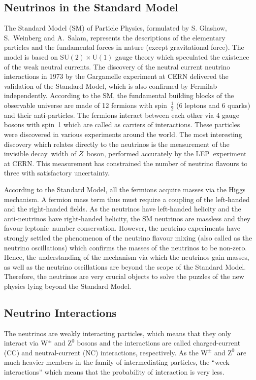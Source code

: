 \subsection{Neutrinos in the Standard Model}
The Standard Model (SM) of Particle Physics, formulated by
S. Glashow, S.~Weinberg and A.~Salam, represents the descriptions of
the elementary particles and the fundamental forces in nature
(except gravitational force)\cite{glashow1959, weinberg1967,abdus1968}.
The model is based on
$\text{SU}\left(2\right)\times\text{U}\left(1\right)$ gauge theory
which speculated the existence of the weak neutral
currents\cite{glashow1961}.
The discovery of the neutral current neutrino interactions in 1973
by the Gargamelle experiment at CERN delivered the validation of the
Standard Model\cite{hasert1973,hasert1973_1,hasert1974}, which is
also confirmed by Fermilab independently\cite{benvenuti1974}.
According to the SM, the fundamental building blocks of the observable
universe are made of 12 fermions with spin~$\frac{1}{2}$ (6 leptons and
6 quarks) and their anti-particles. The fermions interact between
each other via 4 gauge bosons with spin~1 which are called as
carriers of interactions. These particles were discovered in various
experiments around the world. The most interesting discovery which
relates directly to the neutrinos is the measurement of the invisible
decay~width of $Z$~boson, performed accurately by the LEP~experiment
at CERN\cite{numberneut}. This measurement has constrained the number
of neutrino flavours to three with satisfactory uncertainty.

According to the Standard Model, all the fermions acquire masses via
the Higgs mechanism. A fermion mass term thus must require a coupling
of the left-handed and the right-handed fields. As the neutrinos have
left-handed helicity and the anti-neutrinos have right-handed
helicity, the SM neutrinos are massless and they favour
leptonic~number conservation. However, the neutrino experiments have
strongly settled the phenomenon of the neutrino flavour mixing
(also called as the neutrino oscillations) which confirms the masses
of the neutrinos to be non-zero. Hence, the understanding of the
mechanism via which the neutrinos gain masses, as well as the neutrino
oscillations are beyond the scope of the Standard Model. Therefore,
the neutrinos are very crucial objects to solve the puzzles of the
new physics lying beyond the Standard Model.


\subsection{Neutrino Interactions}
The neutrinos are weakly interacting particles, which means that they
only interact via $\mathrm{W}^{\pm}$ and $\mathrm{Z}^{0}$ bosons and the
interactions are called charged-current (CC) and neutral-current (NC)
interactions, respectively. As the $\mathrm{W}^{\pm}$ and
$\mathrm{Z}^{0}$ are much heavier members in the family of
intermediating particles, the ``week interactions'' which means that
the probability of interaction is very less.

